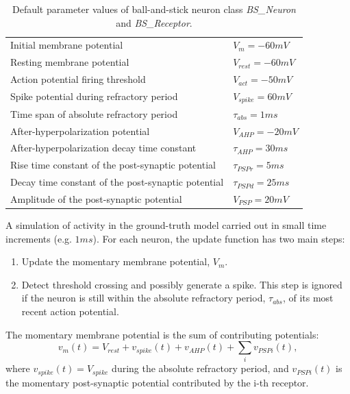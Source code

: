\documentclass{ldr-article}
\begin{document}
\begin{table}
	\begin{tabular}{ll}
		\centering
		Initial membrane potential & $V_m = -60 mV$ \\
		Resting membrane potential & $V_{rest} = -60 mV$ \\
		Action potential firing threshold & $V_{act} = -50 mV$ \\
		Spike potential during refractory period & $V_{spike} = 60 mV$ \\
		Time span of absolute refractory period & $\tau_{abs} = 1 ms$ \\
		After-hyperpolarization potential & $V_{AHP} = -20 mV$ \\
		After-hyperpolarization decay time constant & $\tau_{AHP} = 30 ms$ \\
		\hline
		Rise time constant of the post-synaptic potential & $\tau_{PSPr} = 5 ms$ \\
		Decay time constant of the post-synaptic potential & $\tau_{PSPd} = 25 ms$ \\
		Amplitude of the post-synaptic potential & $V_{PSP} = 20 mV$ \\
	\end{tabular}
	\caption{Default parameter values of ball-and-stick neuron class \textit{BS\_Neuron} and \textit{BS\_Receptor}.\label{tab:bs_neuron_default_pars}}
\end{table}

A simulation of activity in the ground-truth model carried out in small time increments (e.g. $1 ms$). For each neuron, the update function has two main steps:
\begin{enumerate}
	\item Update the momentary membrane potential, $V_m$.
	\item Detect threshold crossing and possibly generate a spike. This step is ignored if the neuron is still within the absolute refractory period, $\tau_{abs}$, of its most recent action potential.
\end{enumerate}

The momentary membrane potential is the sum of contributing potentials:
\begin{equation}\label{eq:membrane-potential}
	v_m(t) = V_{rest} + v_{spike}(t) + v_{AHP}(t) + \sum_i{v_{PSPi}(t)},
\end{equation}
where $v_{spike}(t) = V_{spike}$ during the absolute refractory period, and $v_{PSPi}(t)$ is the momentary post-synaptic potential contributed by the i-th receptor.
\end{document}
